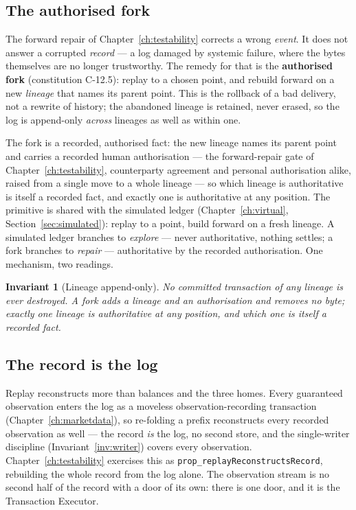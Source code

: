 \documentclass[11pt,a4paper]{article}
\newtheorem{invariant}[definition]{Invariant}
\begin{document}
\subsection{The authorised fork}

The forward repair of Chapter~\ref{ch:testability} corrects a wrong \emph{event}. It does not
answer a corrupted \emph{record} --- a log damaged by systemic failure, where the bytes
themselves are no longer trustworthy. The remedy for that is the \textbf{authorised fork}
(constitution C-12.5): replay to a chosen point, and rebuild forward on a new \emph{lineage}
that names its parent point. This is the rollback of a bad delivery, not a rewrite of history;
the abandoned lineage is retained, never erased, so the log is append-only \emph{across}
lineages as well as within one.

The fork is a recorded, authorised fact: the new lineage names its parent point and carries
a recorded human authorisation --- the forward-repair gate of Chapter~\ref{ch:testability},
counterparty agreement and personal authorisation alike, raised
from a single move to a whole lineage --- so which lineage is authoritative is itself a
recorded fact, and exactly one is authoritative at any position. The primitive is shared
with the simulated ledger (Chapter~\ref{ch:virtual}, Section~\ref{sec:simulated}): replay
to a point, build forward on a fresh lineage. A simulated ledger branches to \emph{explore}
--- never authoritative, nothing settles; a fork branches to \emph{repair} --- authoritative
by the recorded authorisation. One mechanism, two readings.

\begin{invariant}[Lineage append-only]\label{inv:lineage}
No committed transaction of any lineage is ever destroyed. A fork adds a lineage and an
authorisation and removes no byte; exactly one lineage is authoritative at any position, and
which one is itself a recorded fact.
\end{invariant}

\subsection{The record is the log}\label{sec:record-is-log}

Replay reconstructs more than balances and the three homes. Every guaranteed observation
enters the log as a moveless observation-recording transaction
(Chapter~\ref{ch:marketdata}), so re-folding a prefix reconstructs every recorded
observation as well --- the record \emph{is} the log, no second store, and the
single-writer discipline (Invariant~\ref{inv:writer}) covers every observation.
Chapter~\ref{ch:testability} exercises this as
\texttt{prop\_replayReconstructsRecord}, rebuilding the whole record from the log alone.
The observation stream is no second half of the record with a door of its own: there is
one door, and it is the Transaction Executor.
\end{document}
